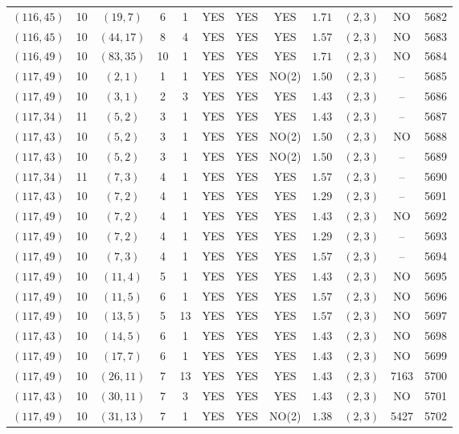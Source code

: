 \begin{longtable}{|c|c|c|c|c|c|c|c|c|c|c|c|}
$(116,45)$ & 10 & $(19,7)$ & 6 & 1 & YES & YES & YES & $1.71$ & $(2,3)$ & NO & 5682\\
$(116,45)$ & 10 & $(44,17)$ & 8 & 4 & YES & YES & YES & $1.57$ & $(2,3)$ & NO & 5683\\
$(116,49)$ & 10 & $(83,35)$ & 10 & 1 & YES & YES & YES & $1.71$ & $(2,3)$ & NO & 5684\\
$(117,49)$ & 10 & $(2,1)$ & 1 & 1 & YES & YES & NO(2) & $1.50$ & $(2,3)$ & -- & 5685\\
$(117,49)$ & 10 & $(3,1)$ & 2 & 3 & YES & YES & YES & $1.43$ & $(2,3)$ & -- & 5686\\
$(117,34)$ & 11 & $(5,2)$ & 3 & 1 & YES & YES & YES & $1.43$ & $(2,3)$ & -- & 5687\\
$(117,43)$ & 10 & $(5,2)$ & 3 & 1 & YES & YES & NO(2) & $1.50$ & $(2,3)$ & NO & 5688\\
$(117,43)$ & 10 & $(5,2)$ & 3 & 1 & YES & YES & NO(2) & $1.50$ & $(2,3)$ & -- & 5689\\
$(117,34)$ & 11 & $(7,3)$ & 4 & 1 & YES & YES & YES & $1.57$ & $(2,3)$ & -- & 5690\\
$(117,43)$ & 10 & $(7,2)$ & 4 & 1 & YES & YES & YES & $1.29$ & $(2,3)$ & -- & 5691\\
$(117,49)$ & 10 & $(7,2)$ & 4 & 1 & YES & YES & YES & $1.43$ & $(2,3)$ & NO & 5692\\
$(117,49)$ & 10 & $(7,2)$ & 4 & 1 & YES & YES & YES & $1.29$ & $(2,3)$ & -- & 5693\\
$(117,49)$ & 10 & $(7,3)$ & 4 & 1 & YES & YES & YES & $1.57$ & $(2,3)$ & -- & 5694\\
$(117,49)$ & 10 & $(11,4)$ & 5 & 1 & YES & YES & YES & $1.43$ & $(2,3)$ & NO & 5695\\
$(117,49)$ & 10 & $(11,5)$ & 6 & 1 & YES & YES & YES & $1.57$ & $(2,3)$ & NO & 5696\\
$(117,49)$ & 10 & $(13,5)$ & 5 & 13 & YES & YES & YES & $1.57$ & $(2,3)$ & NO & 5697\\
$(117,43)$ & 10 & $(14,5)$ & 6 & 1 & YES & YES & YES & $1.43$ & $(2,3)$ & NO & 5698\\
$(117,49)$ & 10 & $(17,7)$ & 6 & 1 & YES & YES & YES & $1.43$ & $(2,3)$ & NO & 5699\\
$(117,49)$ & 10 & $(26,11)$ & 7 & 13 & YES & YES & YES & $1.43$ & $(2,3)$ & 7163 & 5700\\
$(117,43)$ & 10 & $(30,11)$ & 7 & 3 & YES & YES & YES & $1.43$ & $(2,3)$ & NO & 5701\\
$(117,49)$ & 10 & $(31,13)$ & 7 & 1 & YES & YES & NO(2) & $1.38$ & $(2,3)$ & 5427 & 5702\\

\end{longtable}
